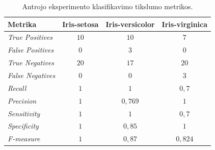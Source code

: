 \begin{table}[H]
    \centering
    \caption{Antrojo eksperimento klasifikavimo tikslumo metrikos.}
    \begin{tabular}{|l|c|c|c|}
        \hline
        \textbf{Metrika} & \textbf{Iris-setosa} & \textbf{Iris-versicolor} & \textbf{Iris-virginica} \\
        \hline
        \textit{True Positives}   & $10$  & $10$  & $7$ \\ \hline
        \textit{False Positives}  & $0$  & $3$   & $0$  \\ \hline
        \textit{True Negatives}   & $20$ & $17$  & $20$ \\ \hline
        \textit{False Negatives}  & $0$  & $0$   & $3$  \\ \hline
        \textit{Recall}           & $1$  & $1$       & $0{,}7$ \\ \hline
        \textit{Precision}        & $1$  & $0{,}769$ & $1$ \\ \hline
        \textit{Sensitivity}      & $1$  & $1$       & $0{,}7$ \\ \hline
        \textit{Specificity}      & $1$  & $0{,}85$ & $1$ \\ \hline
        \textit{F-measure}        & $1$  & $0{,}87$ & $0{,}824$ \\ \hline
    \end{tabular}
    \label{tab:eksperimento_nr_2_klasifikavimo_metrikos}
\end{table}